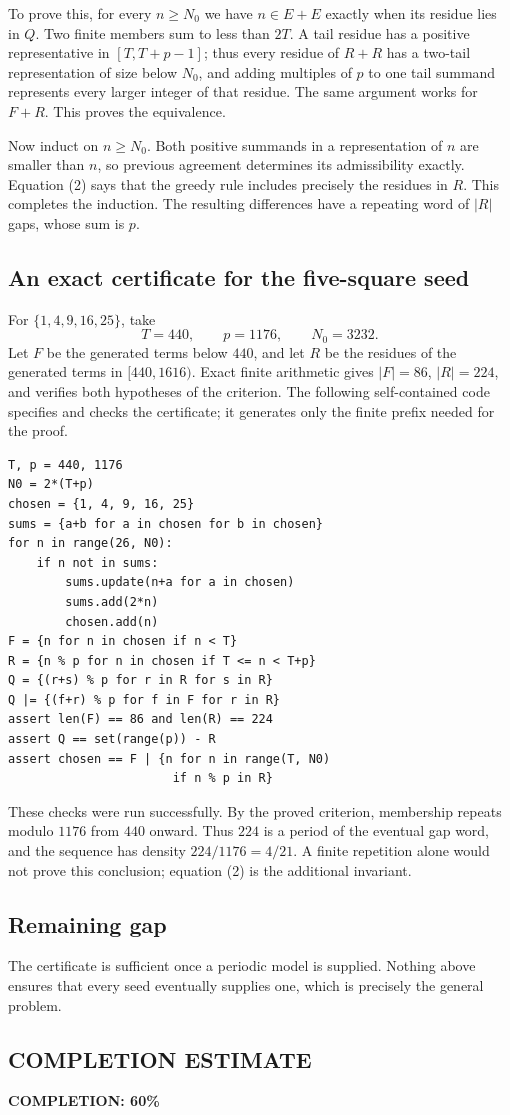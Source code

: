 To prove this, for every $n\ge N_0$ we have $n\in E+E$ exactly when its residue lies in $Q$. Two finite members sum to less than $2T$. A tail residue has a positive representative in $[T,T+p-1]$; thus every residue of $R+R$ has a two-tail representation of size below $N_0$, and adding multiples of $p$ to one tail summand represents every larger integer of that residue. The same argument works for $F+R$. This proves the equivalence.

Now induct on $n\ge N_0$. Both positive summands in a representation of $n$ are smaller than $n$, so previous agreement determines its admissibility exactly. Equation (2) says that the greedy rule includes precisely the residues in $R$. This completes the induction. The resulting differences have a repeating word of $|R|$ gaps, whose sum is $p$.

\subsection*{An exact certificate for the five-square seed}
For $\{1,4,9,16,25\}$, take
\[
 T=440,\qquad p=1176,\qquad N_0=3232.
\]
Let $F$ be the generated terms below $440$, and let $R$ be the residues of the generated terms in $[440,1616)$. Exact finite arithmetic gives $|F|=86$, $|R|=224$, and verifies both hypotheses of the criterion. The following self-contained code specifies and checks the certificate; it generates only the finite prefix needed for the proof.
\begin{verbatim}
T, p = 440, 1176
N0 = 2*(T+p)
chosen = {1, 4, 9, 16, 25}
sums = {a+b for a in chosen for b in chosen}
for n in range(26, N0):
    if n not in sums:
        sums.update(n+a for a in chosen)
        sums.add(2*n)
        chosen.add(n)
F = {n for n in chosen if n < T}
R = {n % p for n in chosen if T <= n < T+p}
Q = {(r+s) % p for r in R for s in R}
Q |= {(f+r) % p for f in F for r in R}
assert len(F) == 86 and len(R) == 224
assert Q == set(range(p)) - R
assert chosen == F | {n for n in range(T, N0)
                       if n % p in R}
\end{verbatim}
These checks were run successfully. By the proved criterion, membership repeats modulo $1176$ from $440$ onward. Thus $224$ is a period of the eventual gap word, and the sequence has density $224/1176=4/21$. A finite repetition alone would not prove this conclusion; equation (2) is the additional invariant.

\subsection*{Remaining gap}
The certificate is sufficient once a periodic model is supplied. Nothing above ensures that every seed eventually supplies one, which is precisely the general problem.
\subsection*{COMPLETION ESTIMATE}
\textbf{COMPLETION: 60\%}

